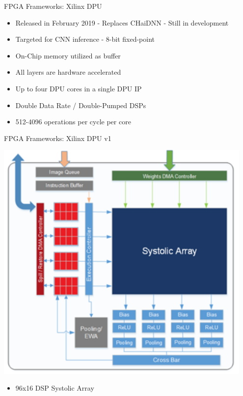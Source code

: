 \begin{frame}{FPGA Frameworks: Xilinx DPU}
	\begin{itemize}
		\item Released in February 2019 - Replaces CHaiDNN - Still in development
		\item Targeted for CNN inference - 8-bit fixed-point
		\item On-Chip memory utilized as buffer
		\item All layers are hardware accelerated
		\item Up to four DPU cores in a single DPU IP
		\item Double Data Rate / Double-Pumped DSPs
		\item 512-4096 operations per cycle per core
	\end{itemize}
\end{frame}

\begin{frame}{FPGA Frameworks: Xilinx DPU v1}
	\begin{minipage}{0.4\textwidth}
		\centering
		\includegraphics[width=0.95\textwidth]{../Images/Hardware/dpu-v1-architecture.png}\\
	\end{minipage}%
	\begin{minipage}{0.6\textwidth}
		\begin{itemize}
			\item 96x16 DSP Systolic Array
		\end{itemize}
	\end{minipage}
\end{frame}

